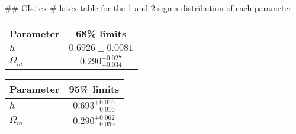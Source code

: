 ## CIs.tex
# latex table for the 1 and 2 sigma distribution of each parameter

\begin{tabular} { l  c}
 Parameter &  68\% limits\\
\hline
{\boldmath$h              $} & $0.6926\pm 0.0081          $\\
{\boldmath$\Omega_m       $} & $0.290^{+0.027}_{-0.034}   $\\
\hline
\end{tabular}

\begin{tabular} { l  c}
 Parameter &  95\% limits\\
\hline
{\boldmath$h              $} & $0.693^{+0.016}_{-0.016}   $\\
{\boldmath$\Omega_m       $} & $0.290^{+0.062}_{-0.059}   $\\
\hline
\end{tabular}
